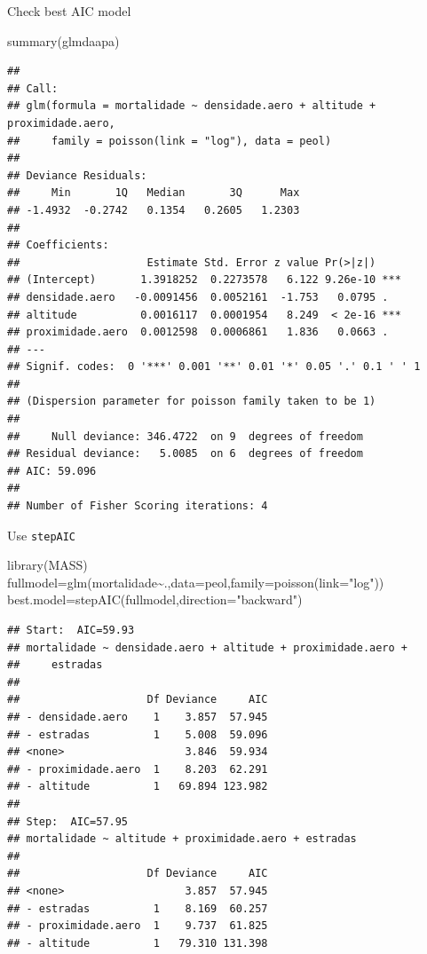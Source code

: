 \documentclass[
]{book}
\newenvironment{Shaded}{\begin{snugshade}}{\end{snugshade}}
\newcommand{\AttributeTok}[1]{\textcolor[rgb]{0.77,0.63,0.00}{#1}}
\newcommand{\FunctionTok}[1]{\textcolor[rgb]{0.00,0.00,0.00}{#1}}
\newcommand{\NormalTok}[1]{#1}
\newcommand{\OtherTok}[1]{\textcolor[rgb]{0.56,0.35,0.01}{#1}}
\newcommand{\SpecialCharTok}[1]{\textcolor[rgb]{0.00,0.00,0.00}{#1}}
\newcommand{\StringTok}[1]{\textcolor[rgb]{0.31,0.60,0.02}{#1}}
\begin{document}
Check best AIC model

\begin{Shaded}
\begin{Highlighting}[]
\FunctionTok{summary}\NormalTok{(glmdaapa)}
\end{Highlighting}
\end{Shaded}

\begin{verbatim}
## 
## Call:
## glm(formula = mortalidade ~ densidade.aero + altitude + proximidade.aero, 
##     family = poisson(link = "log"), data = peol)
## 
## Deviance Residuals: 
##     Min       1Q   Median       3Q      Max  
## -1.4932  -0.2742   0.1354   0.2605   1.2303  
## 
## Coefficients:
##                    Estimate Std. Error z value Pr(>|z|)    
## (Intercept)       1.3918252  0.2273578   6.122 9.26e-10 ***
## densidade.aero   -0.0091456  0.0052161  -1.753   0.0795 .  
## altitude          0.0016117  0.0001954   8.249  < 2e-16 ***
## proximidade.aero  0.0012598  0.0006861   1.836   0.0663 .  
## ---
## Signif. codes:  0 '***' 0.001 '**' 0.01 '*' 0.05 '.' 0.1 ' ' 1
## 
## (Dispersion parameter for poisson family taken to be 1)
## 
##     Null deviance: 346.4722  on 9  degrees of freedom
## Residual deviance:   5.0085  on 6  degrees of freedom
## AIC: 59.096
## 
## Number of Fisher Scoring iterations: 4
\end{verbatim}

Use \texttt{stepAIC}

\begin{Shaded}
\begin{Highlighting}[]
\FunctionTok{library}\NormalTok{(MASS)}
\NormalTok{fullmodel}\OtherTok{=}\FunctionTok{glm}\NormalTok{(mortalidade}\SpecialCharTok{\textasciitilde{}}\NormalTok{.,}\AttributeTok{data=}\NormalTok{peol,}\AttributeTok{family=}\FunctionTok{poisson}\NormalTok{(}\AttributeTok{link=}\StringTok{"log"}\NormalTok{))}
\NormalTok{best.model}\OtherTok{=}\FunctionTok{stepAIC}\NormalTok{(fullmodel,}\AttributeTok{direction=}\StringTok{"backward"}\NormalTok{)}
\end{Highlighting}
\end{Shaded}

\begin{verbatim}
## Start:  AIC=59.93
## mortalidade ~ densidade.aero + altitude + proximidade.aero + 
##     estradas
## 
##                    Df Deviance     AIC
## - densidade.aero    1    3.857  57.945
## - estradas          1    5.008  59.096
## <none>                   3.846  59.934
## - proximidade.aero  1    8.203  62.291
## - altitude          1   69.894 123.982
## 
## Step:  AIC=57.95
## mortalidade ~ altitude + proximidade.aero + estradas
## 
##                    Df Deviance     AIC
## <none>                   3.857  57.945
## - estradas          1    8.169  60.257
## - proximidade.aero  1    9.737  61.825
## - altitude          1   79.310 131.398
\end{verbatim}
\end{document}
